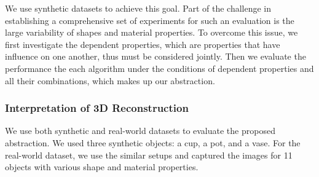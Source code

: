 We use synthetic datasets to achieve this goal. Part of the challenge in establishing a comprehensive set of experiments for such an evaluation is the large variability of shapes and material properties. To overcome this issue, we first investigate the dependent properties, which are properties that have influence on one another, thus must be considered jointly. Then we evaluate the performance the each algorithm under the conditions of dependent properties and all their combinations, which makes up our abstraction.

\subsubsection{Interpretation of 3D Reconstruction}
We use both synthetic and real-world datasets to evaluate the proposed abstraction. We used three synthetic objects: a cup, a pot, and a vase. For the real-world dataset, we use the similar setups and captured the images for 11 objects with various shape and material properties.

